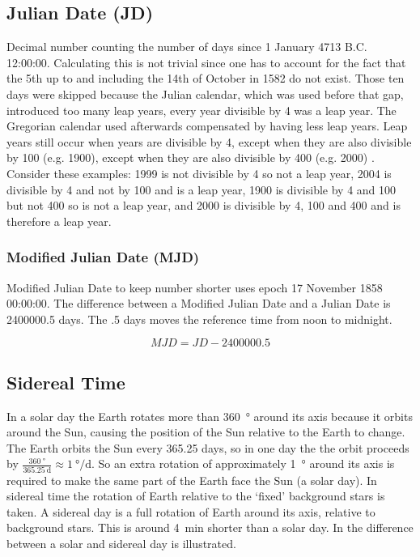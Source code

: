 \subsection{Julian Date (JD)}

Decimal number counting the number of days since 1 January 4713 B.C.
12:00:00. Calculating this is not trivial since one has to account for
the fact that the 5th up to and including the 14th of October in 1582 do
not exist. Those ten days were skipped because the Julian calendar,
which was used before that gap, introduced too many leap years, every
year divisible by 4 was a leap year. The Gregorian calendar used
afterwards compensated by having less leap years. Leap years still occur
when years are divisible by 4, except when they are also divisible by
100 (e.g. 1900), except when they are also divisible by 400 (e.g. 2000)
\cite{acf:2014aa}. Consider these examples: 1999 is not divisible by 4
so not a leap year, 2004 is divisible by 4 and not by 100 and is a leap
year, 1900 is divisible by 4 and 100 but not 400 so is not a leap year,
and 2000 is divisible by 4, 100 and 400 and is therefore a leap year.


\subsubsection{Modified Julian Date (MJD)}

Modified Julian Date to keep number shorter uses epoch 17 November 1858
00:00:00. The difference between a Modified Julian Date and a Julian
Date is 2400000.5 days. The .5 days moves the reference time from noon
to midnight.

\begin{equation}
    MJD = JD - 2400000.5
\end{equation}


\subsection{Sidereal Time}

In a solar day the Earth rotates more than \SI{360}{\degree} around its
axis because it orbits around the Sun, causing the position of the Sun
relative to the Earth to change. The Earth orbits the Sun every 365.25
days, so in one day the the orbit proceeds by
$\frac{\SI{360}{\degree}}{\SI{365.25}{\day}} \approx
\SI{1}{\degree\per\day}$. So an extra rotation of approximately
\SI{1}{\degree} around its axis is required to make the same part of the
Earth face the Sun (a solar day). In sidereal time the rotation of Earth
relative to the `fixed' background stars is taken. A sidereal day is a
full rotation of Earth around its axis, relative to background stars.
This is around \SI{4}{\minute} shorter than a solar day. In
 the difference between a solar and sidereal
day is illustrated.

